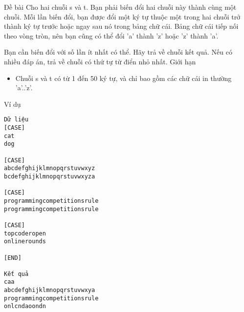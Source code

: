Đề bài
Cho hai chuỗi s và t. Bạn phải biến đổi hai chuỗi này thành cùng một chuỗi. Mỗi lần biến đổi, bạn được đổi một ký tự thuộc một trong hai chuỗi trở thành ký tự trước hoặc ngay sau nó trong bảng chữ cái. Bảng chữ cái tiếp nối theo vòng tròn, nên bạn cũng có thể đổi 'a' thành 'z' hoặc 'z' thành 'a'.  

   Bạn cần biến đổi với số lần ít nhất có thể. Hãy trả về chuỗi kết quả. Nếu có nhiều đáp án, trả về chuỗi có thứ tự từ điển nhỏ nhất.
Giới hạn
\begin{itemize}
	\item     Chuỗi s và t có từ 1 đến 50 ký tự, và chỉ bao gồm các chữ cái in thường 'a'..'z'.   
\end{itemize}
Ví dụ
\begin{verbatim}
Dữ liệu
[CASE]
cat
dog

[CASE]
abcdefghijklmnopqrstuvwxyz
bcdefghijklmnopqrstuvwxyza

[CASE]
programmingcompetitionsrule
programmingcompetitionsrule

[CASE]
topcoderopen
onlinerounds

[END]

Kết quả
caa
abcdefghijklmnopqrstuvwxya
programmingcompetitionsrule
onlcndaoondn
\end{verbatim}